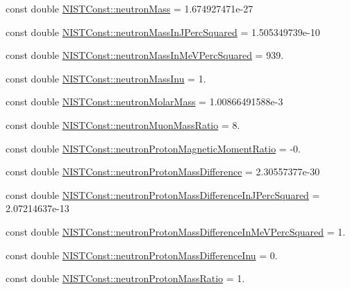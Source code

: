 \begin{DoxyCompactItemize}
\item 
const double \hyperlink{group___n_i_s_t_const-_neutron_ga74edcc04e59f152b2afa0fdba8683383}{N\+I\+S\+T\+Const\+::neutron\+Mass} = 1.\+674927471e-\/27
\item 
const double \hyperlink{group___n_i_s_t_const-_neutron_ga28892913d6ed40673a170941f79bb86e}{N\+I\+S\+T\+Const\+::neutron\+Mass\+In\+J\+Perc\+Squared} = 1.\+505349739e-\/10
\item 
const double \hyperlink{group___n_i_s_t_const-_neutron_ga53f986a22e4dcb31cc8ed8151fd18a8e}{N\+I\+S\+T\+Const\+::neutron\+Mass\+In\+Me\+V\+Perc\+Squared} = 939.
\item 
const double \hyperlink{group___n_i_s_t_const-_neutron_ga7931fb41eb5f1acf4b94d9d6b92ca4c3}{N\+I\+S\+T\+Const\+::neutron\+Mass\+Inu} = 1.
\item 
const double \hyperlink{group___n_i_s_t_const-_neutron_ga0f7ab7fc272f54c17ecf777efff7003b}{N\+I\+S\+T\+Const\+::neutron\+Molar\+Mass} = 1.\+00866491588e-\/3
\item 
const double \hyperlink{group___n_i_s_t_const-_neutron_ga91ae8b70076ca6001d2141d1df72a39c}{N\+I\+S\+T\+Const\+::neutron\+Muon\+Mass\+Ratio} = 8.
\item 
const double \hyperlink{group___n_i_s_t_const-_neutron_ga98c2f64e48dbd352a997b82d8815daba}{N\+I\+S\+T\+Const\+::neutron\+Proton\+Magnetic\+Moment\+Ratio} = -\/0.
\item 
const double \hyperlink{group___n_i_s_t_const-_neutron_ga95ef0427b50433511707f0949fc503b9}{N\+I\+S\+T\+Const\+::neutron\+Proton\+Mass\+Difference} = 2.\+30557377e-\/30
\item 
const double \hyperlink{group___n_i_s_t_const-_neutron_gaa89b2b23475d809d4d3a4c46e7556b71}{N\+I\+S\+T\+Const\+::neutron\+Proton\+Mass\+Difference\+In\+J\+Perc\+Squared} = 2.\+07214637e-\/13
\item 
const double \hyperlink{group___n_i_s_t_const-_neutron_gae96854e1fcd14f08cc92a060c6690730}{N\+I\+S\+T\+Const\+::neutron\+Proton\+Mass\+Difference\+In\+Me\+V\+Perc\+Squared} = 1.
\item 
const double \hyperlink{group___n_i_s_t_const-_neutron_ga570caff89957976a8486d25e5288df51}{N\+I\+S\+T\+Const\+::neutron\+Proton\+Mass\+Difference\+Inu} = 0.
\item 
const double \hyperlink{group___n_i_s_t_const-_neutron_gad8a08222b3de2105b5b399faa5a59fbd}{N\+I\+S\+T\+Const\+::neutron\+Proton\+Mass\+Ratio} = 1.
\item 

\end{DoxyCompactItemize}
